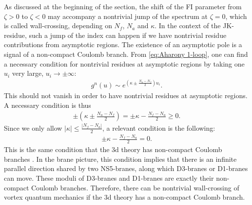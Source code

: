 \documentclass[a4paper,11pt]{article}
\begin{document}
As discussed at the beginning of the section, the shift of the FI parameter from $\zeta > 0 $ to $\zeta < 0$ may accompany a nontrivial jump of the spectrum at $\zeta = 0$, which is called wall-crossing, depending on $N_f$, $N_a$ and $\kappa$. In the context of the JK-residue, such a jump of the index can happen if we have nontrivial residue contributions from asymptotic regions. The existence of an asymptotic pole is a signal of a non-compact Coulomb branch. From \eqref{eq:Aharony 1-loop}, one can find a necessary condition for nontrivial residues at asymptotic regions by taking one $u_i$ very large, $u_i \rightarrow \pm \infty$:
\begin{align}
g^n(u) \sim e^{\left(\kappa \pm \frac{N_a-N_f}{2}\right) u_i}.
\end{align}
This should not vanish in order to have nontrivial residues at asymptotic regions. A necessary condition is thus
\begin{align}
\pm (\kappa \pm \frac{N_a-N_f}{2}) = \pm \kappa-\frac{N_f-N_a}{2} \geq 0.
\end{align}
Since we only allow $|\kappa| \leq \frac{|N_f-N_a|}{2}$, a relevant condition is the following:
\begin{align} \label{eq:cond}
\pm \kappa-\frac{N_f-N_a}{2} = 0.
\end{align}
This is the same condition that the 3d theory has non-compact Coulomb branches \cite{Benini:2011mf}. In the brane picture, this condition implies that there is an infinite parallel direction shared by two NS5-branes, along which D3-branes or D1-branes can move. These moduli of D3-branes and D1-branes are exactly their non-compact Coulomb branches. Therefore, there can be nontrivial wall-crossing of vortex quantum mechanics if the 3d theory has a non-compact Coulomb branch.
\end{document}
